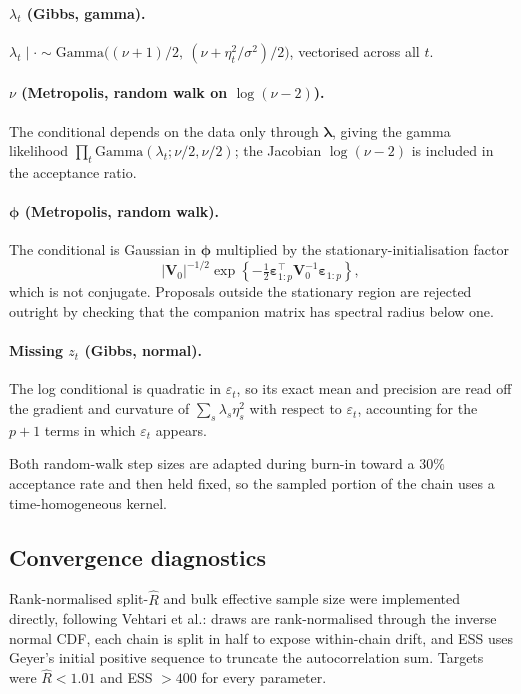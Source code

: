 \documentclass[11pt]{article}
\begin{document}
\paragraph{$\lambda_t$ (Gibbs, gamma).}
$\lambda_t \mid \cdot \sim \mathrm{Gamma}\big((\nu+1)/2,\ (\nu + \eta_t^2/\sigma^2)/2\big)$,
vectorised across all $t$.

\paragraph{$\nu$ (Metropolis, random walk on $\log(\nu-2)$).} The conditional
depends on the data only through $\boldsymbol\lambda$, giving the gamma
likelihood $\prod_t \mathrm{Gamma}(\lambda_t;\nu/2,\nu/2)$; the Jacobian
$\log(\nu-2)$ is included in the acceptance ratio.

\paragraph{$\boldsymbol\phi$ (Metropolis, random walk).} The conditional is
Gaussian in $\boldsymbol\phi$ multiplied by the stationary-initialisation factor
\[
|\mathbf{V}_0|^{-1/2}\exp\!\left\{-\tfrac12\boldsymbol\varepsilon_{1:p}^{\top}\mathbf{V}_0^{-1}\boldsymbol\varepsilon_{1:p}\right\},
\]
which is not conjugate. Proposals outside the stationary region are rejected
outright by checking that the companion matrix has spectral radius below one.

\paragraph{Missing $z_t$ (Gibbs, normal).} The log conditional is quadratic in
$\varepsilon_t$, so its exact mean and precision are read off the gradient and
curvature of $\sum_s \lambda_s\eta_s^2$ with respect to $\varepsilon_t$,
accounting for the $p+1$ terms in which $\varepsilon_t$ appears.

Both random-walk step sizes are adapted during burn-in toward a $30\%$
acceptance rate and then held fixed, so the sampled portion of the chain uses a
time-homogeneous kernel.

\subsection{Convergence diagnostics}

Rank-normalised split-$\hat R$ and bulk effective sample size were implemented
directly, following Vehtari et al.: draws are rank-normalised through the
inverse normal CDF, each chain is split in half to expose within-chain drift,
and ESS uses Geyer's initial positive sequence to truncate the autocorrelation
sum. Targets were $\hat R < 1.01$ and ESS $> 400$ for every parameter.
\end{document}
